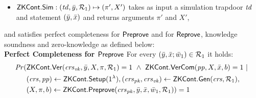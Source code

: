 \begin{definition}[ZK Continuations]
\begin{itemize}
\item ${\mathsf{ZKCont}}.{\mathsf{Sim}}: (\mathit{td}, \bar{y}, \mathcal{R}_1) \mapsto (\pi', X')$ takes as input a simulation trapdoor $\mathit{td}$ and statement $(\bar{y}, \bar{x})$ and returns 
arguments $\pi'$ and $X'$,
\end{itemize}
and satisfies perfect completeness for ${\mathsf{Preprove}}$ and for ${\mathsf{Reprove}}$,  knowledge soundness and zero-knowledge as defined below:\\
\noindent \textbf{Perfect Completeness for ${\mathsf{Preprove}}$} For every $(\bar{y}, \bar{x}; \bar{w}_1) \in \mathcal{R}_1$ it holds:
\begin{align*}
\mathit{Pr} (& {\mathsf{ZKCont}}.{\mathsf{Ver}}(\mathit{crs}_{\mathit{vk}}, \bar{y}, X, \pi, \mathcal{R}_1) = 1 \ \wedge \ {\mathsf{ZKCont}}.{\mathsf{VerCom}} (\mathit{pp}, X, \bar{x}, b) = 1\  | \ \\ 
                   & (\mathit{crs}, \mathit{pp}) \leftarrow {\ensuremath{\mathsf{ZKCont}}}.{\mathsf{Setup}} (1^{\lambda}), (\mathit{crs}_{\mathit{pk}}, \mathit{crs}_{\mathit{vk}}) \leftarrow {\ensuremath{\mathsf{ZKCont}}}.\mathsf{Gen}(\mathit{crs}, \mathcal{R}_1), \\ 
                   & (X, \pi, b) \leftarrow {\ensuremath{\mathsf{ZKCont}}}.{\mathsf{Preprove}}(\mathit{crs}_{\mathit{pk}}, \bar{y}, \bar{x}, \bar{w}_1, \mathcal{R}_1)) = 1
\end{align*}


\end{definition}
